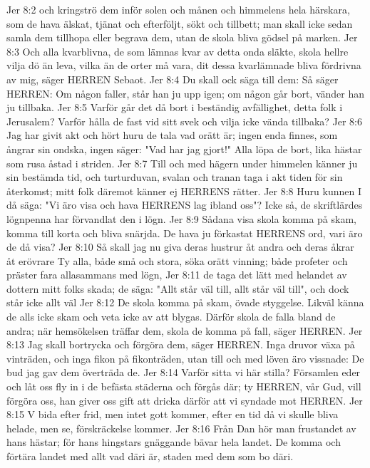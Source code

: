 Jer 8:2  och kringströ dem inför solen och månen och himmelens hela härskara, som de hava älskat, tjänat och efterföljt, sökt och tillbett; man skall icke sedan samla dem tillhopa eller begrava dem, utan de skola bliva gödsel på marken.
Jer 8:3  Och alla kvarblivna, de som lämnas kvar av detta onda släkte, skola hellre vilja dö än leva, vilka än de orter må vara, dit dessa kvarlämnade bliva fördrivna av mig, säger HERREN Sebaot.
Jer 8:4  Du skall ock säga till dem: Så säger HERREN: Om någon faller, står han ju upp igen; om någon går bort, vänder han ju tillbaka.
Jer 8:5  Varför går det då bort i beständig avfällighet, detta folk i Jerusalem? Varför hålla de fast vid sitt svek och vilja icke vända tillbaka?
Jer 8:6  Jag har givit akt och hört huru de tala vad orätt är; ingen enda finnes, som ångrar sin ondska, ingen säger: "Vad har jag gjort!" Alla löpa de bort, lika hästar som rusa åstad i striden.
Jer 8:7  Till och med hägern under himmelen känner ju sin bestämda tid, och turturduvan, svalan och tranan taga i akt tiden för sin återkomst; mitt folk däremot känner ej HERRENS rätter.
Jer 8:8  Huru kunnen I då säga: "Vi äro visa och hava HERRENS lag ibland oss"? Icke så, de skriftlärdes lögnpenna har förvandlat den i lögn.
Jer 8:9  Sådana visa skola komma på skam, komma till korta och bliva snärjda. De hava ju förkastat HERRENS ord, vari äro de då visa?
Jer 8:10  Så skall jag nu giva deras hustrur åt andra och deras åkrar åt erövrare Ty alla, både små och stora, söka orätt vinning; både profeter och präster fara allasammans med lögn,
Jer 8:11  de taga det lätt med helandet av dottern mitt folks skada; de säga: "Allt står väl till, allt står väl till", och dock står icke allt väl
Jer 8:12  De skola komma på skam, övade styggelse. Likväl känna de alls icke skam och veta icke av att blygas. Därför skola de falla bland de andra; när hemsökelsen träffar dem, skola de komma på fall, säger HERREN.
Jer 8:13  Jag skall bortrycka och förgöra dem, säger HERREN. Inga druvor växa på vinträden, och inga fikon på fikonträden, utan till och med löven äro vissnade: De bud jag gav dem överträda de.
Jer 8:14  Varför sitta vi här stilla? Församlen eder och låt oss fly in i de befästa städerna och förgås där; ty HERREN, vår Gud, vill förgöra oss, han giver oss gift att dricka därför att vi syndade mot HERREN.
Jer 8:15  V bida efter frid, men intet gott kommer, efter en tid då vi skulle bliva helade, men se, förskräckelse kommer.
Jer 8:16  Från Dan hör man frustandet av hans hästar; för hans hingstars gnäggande bävar hela landet. De komma och förtära landet med allt vad däri är, staden med dem som bo däri.
